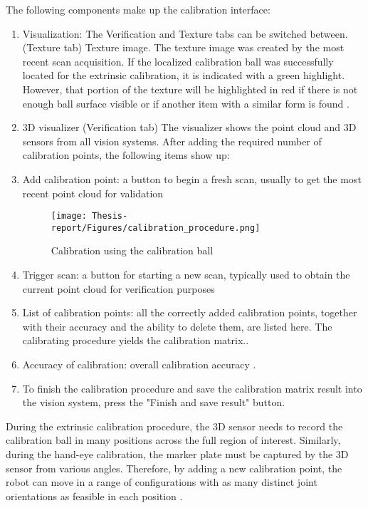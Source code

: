 \documentclass[12pt]{article}
\begin{document}
The following components make up the calibration interface:
\begin{enumerate}
    \item   Visualization: The Verification and Texture tabs can be switched between.
 (Texture tab) Texture image. The texture image was created by the most recent scan acquisition. If the localized calibration ball was successfully located for the extrinsic calibration, it is indicated with a green highlight. However, that portion of the texture will be highlighted in red if there is not enough ball surface visible or if another item with a similar form is found \cite{ref2}.
 \item   3D visualizer (Verification tab) 
The visualizer shows the point cloud and 3D sensors from all vision systems.
 After adding the required number of calibration points, the following items show up: \cite{ref2}
\item  Add calibration point: a button to begin a fresh scan, usually to get the most recent point cloud for validation \cite{ref2}
\begin{figure}[h]
    \centering
    \texttt{[image: Thesis-report/Figures/calibration\_procedure.png]}
    \caption{Calibration using the calibration ball \cite{ref2} }
    \label{fig:Photoneo Cmaera}
\end{figure} 

\item   Trigger scan: a button for starting a new scan, typically used to obtain the current point cloud for verification purposes \cite{ref2}
\item  List of calibration points: all the correctly added calibration points, together with their accuracy and the ability to delete them, are listed here.  The calibrating procedure yields the calibration matrix.\cite{ref2}.
\item   Accuracy of calibration: overall calibration accuracy \cite{ref2}.
\item  To finish the calibration procedure and save the calibration matrix result into the vision system, press the "Finish and save result" button\cite{ref2}.
\end{enumerate}

During the extrinsic calibration procedure, the 3D sensor needs to record the calibration ball in many positions across the full region of interest. Similarly, during the hand-eye calibration, the marker plate must be captured by the 3D sensor from various angles.  Therefore, by adding a new calibration point, the robot can move in a range of configurations with as many distinct joint orientations as feasible in each position \cite{ref2}.
\end{document}
